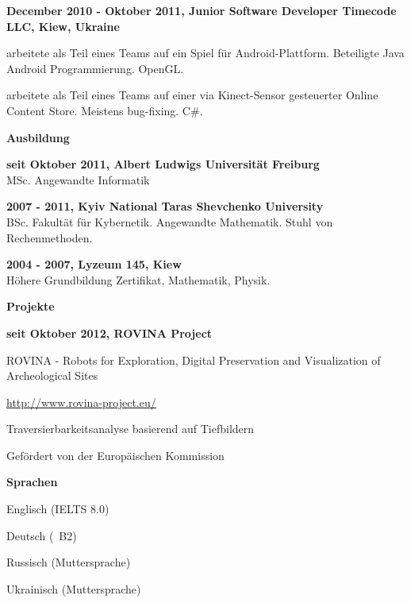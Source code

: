 \documentclass[a4paper,12pt,final]{memoir}
\newcommand{\SmallSep}{\vspace{0.5em}}
\newcommand{\CVSection}[1]
	{\Large\textbf{#1}\par
	\SmallSep\normalsize\normalfont}
\newcommand{\CVItem}[1]
	{\textbf{\color{MidnightBlue} #1}}
\begin{document}
\CVItem{December 2010 - Oktober 2011, Junior Software Developer
\newline Timecode LLC, Kiew, Ukraine}
\begin{compactitem}[\color{MidnightBlue}$\circ$]
\item arbeitete als Teil eines Teams auf ein Spiel f\"{u}r Android-Plattform. Beteiligte Java Android Programmierung. OpenGL.
\item arbeitete als Teil eines Teams auf einer via Kinect-Sensor gesteuerter Online Content Store. Meistens bug-fixing. C\#.
\end{compactitem}
\SmallSep

\CVSection{Ausbildung}
\CVItem{seit Oktober 2011, Albert Ludwigs Universit\"{a}t Freiburg}\\
MSc. Angewandte Informatik
\SmallSep

\CVItem{2007 - 2011, Kyiv National Taras Shevchenko University}\\
BSc. Fakult\"{a}t f\"{u}r Kybernetik. Angewandte Mathematik. 
\newline Stuhl von Rechenmethoden.
\SmallSep

\CVItem{2004 - 2007, Lyzeum 145, Kiew}\\
H\"{o}here Grundbildung Zertifikat, Mathematik, Physik.
\SmallSep
\framebreak
\clearpage
\framebreak
\framebreak

\CVSection{Projekte}
\CVItem{seit Oktober 2012, ROVINA Project}
\begin{compactitem}[\color{MidnightBlue}$\circ$]
	\item ROVINA - Robots for Exploration, Digital Preservation and Visualization of Archeological Sites
	\item \href{http://www.rovina-project.eu/}{http://www.rovina-project.eu/} 
	\item Traversierbarkeitsanalyse basierend auf Tiefbildern
	\item Gef\"{o}rdert von der Europ\"{a}ischen Kommission
\end{compactitem}
\SmallSep

\CVSection{Sprachen}
\begin{compactitem}[\color{MidnightBlue}$\circ$]
	\item Englisch (IELTS 8.0)
	\item Deutsch (~B2) 
	\item Russisch (Muttersprache) 
	\item Ukrainisch (Muttersprache)
\end{compactitem}
\SmallSep
\end{document}
